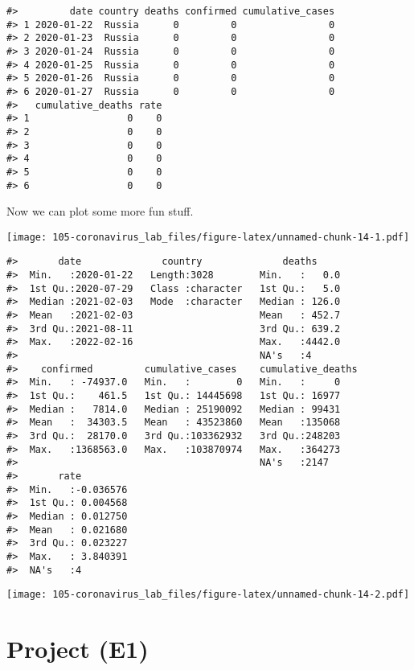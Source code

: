 \documentclass[
]{book}
\begin{document}
\begin{verbatim}
#>         date country deaths confirmed cumulative_cases
#> 1 2020-01-22  Russia      0         0                0
#> 2 2020-01-23  Russia      0         0                0
#> 3 2020-01-24  Russia      0         0                0
#> 4 2020-01-25  Russia      0         0                0
#> 5 2020-01-26  Russia      0         0                0
#> 6 2020-01-27  Russia      0         0                0
#>   cumulative_deaths rate
#> 1                 0    0
#> 2                 0    0
#> 3                 0    0
#> 4                 0    0
#> 5                 0    0
#> 6                 0    0
\end{verbatim}

Now we can plot some more fun stuff.

\texttt{[image: 105-coronavirus\_lab\_files/figure-latex/unnamed-chunk-14-1.pdf]}

\begin{verbatim}
#>       date              country              deaths      
#>  Min.   :2020-01-22   Length:3028        Min.   :   0.0  
#>  1st Qu.:2020-07-29   Class :character   1st Qu.:   5.0  
#>  Median :2021-02-03   Mode  :character   Median : 126.0  
#>  Mean   :2021-02-03                      Mean   : 452.7  
#>  3rd Qu.:2021-08-11                      3rd Qu.: 639.2  
#>  Max.   :2022-02-16                      Max.   :4442.0  
#>                                          NA's   :4       
#>    confirmed         cumulative_cases    cumulative_deaths
#>  Min.   : -74937.0   Min.   :        0   Min.   :     0   
#>  1st Qu.:    461.5   1st Qu.: 14445698   1st Qu.: 16977   
#>  Median :   7814.0   Median : 25190092   Median : 99431   
#>  Mean   :  34303.5   Mean   : 43523860   Mean   :135068   
#>  3rd Qu.:  28170.0   3rd Qu.:103362932   3rd Qu.:248203   
#>  Max.   :1368563.0   Max.   :103870974   Max.   :364273   
#>                                          NA's   :2147     
#>       rate          
#>  Min.   :-0.036576  
#>  1st Qu.: 0.004568  
#>  Median : 0.012750  
#>  Mean   : 0.021680  
#>  3rd Qu.: 0.023227  
#>  Max.   : 3.840391  
#>  NA's   :4
\end{verbatim}

\texttt{[image: 105-coronavirus\_lab\_files/figure-latex/unnamed-chunk-14-2.pdf]}

\hypertarget{project-e1}{%
\chapter{Project (E1)}\label{project-e1}}
\end{document}
